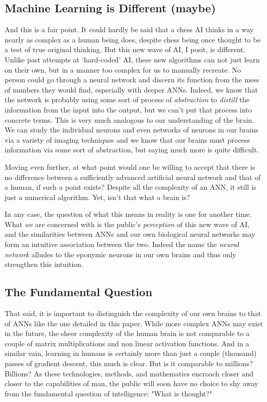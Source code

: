 \documentclass{article}
\begin{document}
\subsection{Machine Learning is Different (maybe)}
And this is a fair point. It could hardly be said that a chess AI thinks in a way nearly as complex as a human being does, despite chess being once thought to be a test of true original thinking. But this new wave of AI, I posit, is different. Unlike past attempts at `hard-coded' AI, these new algorithms can not just learn on their own, but in a manner too complex for us to manually recreate. No person could go through a neural network and discern its function from the mess of numbers they would find, especially with deeper ANNs. Indeed, we know that the network is probably using some sort of process of \textit{abstraction} to \textit{distill} the information from the input into the output, but we can't put that process into concrete terms. This is very much analogous to our understanding of the brain. We can study the individual neurons and even networks of neurons in our brains via a variety of imaging techniques and we know that our brains must process information via some sort of abstraction, but saying much more is quite difficult.

Moving even further, at what point would one be willing to accept that there is no difference between a sufficiently advanced artificial neural network and that of a human, if such a point exists? Despite all the complexity of an ANN, it still is just a numerical algorithm. Yet, isn't that what a brain is?

In any case, the question of what this means in reality is one for another time. What \textit{we} are concerned with is the public's \textit{perception} of this new wave of AI, and the similarities between ANNs and our own biological neural networks may form an intuitive association between the two. Indeed the name the \textit{neural network} alludes to the eponymic neurons in our own brains and thus only strengthen this intuition.

\subsection{The Fundamental Question}
That said, it is important to distinguish the complexity of our own brains to that of ANNs like the one detailed in this paper. While more complex ANNs may exist in the future, the sheer complexity of the human brain is not comparable to a couple of matrix multiplications and non linear activation functions. And in a similar vain, learning in humans is certainly more than just a couple (thousand) passes of gradient descent, this much is clear. But is it comparable to millions? Billions? As these technologies, methods, and mathematics encroach closer and closer to the capabilities of man, the public will soon have no choice to shy away from the fundamental question of intelligence: "What is thought?"
\end{document}
